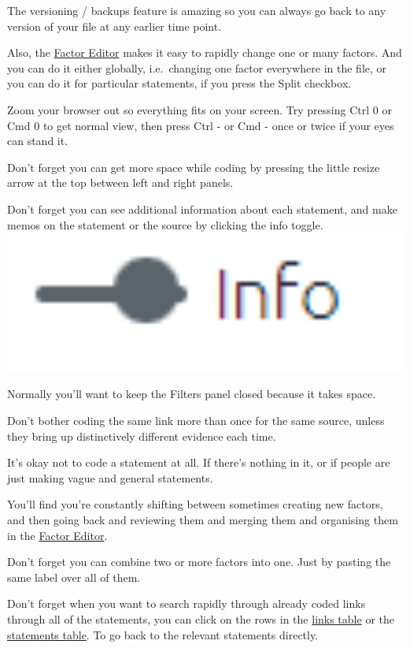 \documentclass[
]{book}
\begin{document}
The versioning / backups feature is amazing so you can always go back to any version of your file at any earlier time point.

Also, the \protect\hyperlink{factor-editor}{Factor Editor} makes it easy to rapidly change one or many factors. And you can do it either globally, i.e.~changing one factor everywhere in the file, or you can do it for particular statements, if you press the Split checkbox.

Zoom your browser out so everything fits on your screen. Try pressing Ctrl 0 or Cmd 0 to get normal view, then press Ctrl - or Cmd - once or twice if your eyes can stand it.

Don't forget you can get more space while coding by pressing the little resize arrow at the top between left and right panels.

Don't forget you can see additional information about each statement, and make memos on the statement or the source by clicking the info toggle. \includegraphics[width=6.77083in,height=\textheight]{_assets/image-20211220153222953.png}

Normally you'll want to keep the Filters panel closed because it takes space.

Don't bother coding the same link more than once for the same source, unless they bring up distinctively different evidence each time.

It's okay not to code a statement at all. If there's nothing in it, or if people are just making vague and general statements.

You'll find you're constantly shifting between sometimes creating new factors, and then going back and reviewing them and merging them and organising them in the \protect\hyperlink{factor-editor}{Factor Editor}.

Don't forget you can combine two or more factors into one. Just by pasting the same label over all of them.

Don't forget when you want to search rapidly through already coded links through all of the statements, you can click on the rows in the \protect\hyperlink{the-links-table}{links table} or the \protect\hyperlink{the-statements-table}{statements table}. To go back to the relevant statements directly.
\end{document}
